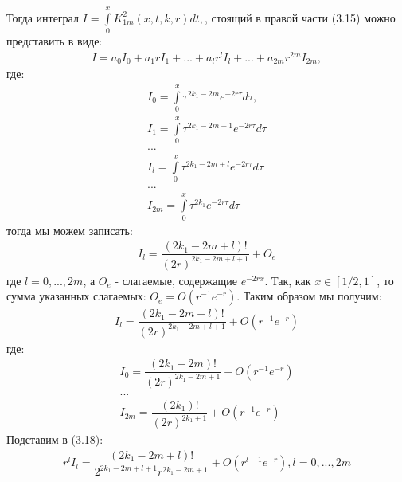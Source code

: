 Тогда интеграл $ I = \int\limits_0^x K_{1m}^2(x,t,k,r)dt, $, стоящий в правой части (3.15) можно представить в виде:
\begin{equation}
\begin{array}{c}

I = a_0I_0 + a_1rI_1 + ... + a_lr^lI_l + ... + a_{2m}r^{2m}I_{2m},

\end{array}
\end{equation}
где:
\begin{equation}
\begin{array}{c}
\nonumber

I_0 = \int\limits_0^x \tau^{2k_1-2m}e^{-2r\tau}d\tau , \\
I_1 = \int\limits_0^x \tau^{2k_1-2m+1}e^{-2r\tau}d\tau \\
... \\
I_l = \int\limits_0^x \tau^{2k_1-2m+l}e^{-2r\tau}d\tau \\
... \\
I_{2m} = \int\limits_0^x \tau^{2k_1}e^{-2r\tau}d\tau

\end{array}
\end{equation}
тогда мы можем записать:
\begin{equation}
\begin{array}{c}
\nonumber

I_l = \dfrac{(2k_1 -2m +l)!}{(2r)^{2k_1-2m+l+1}} + O_e

\end{array}
\end{equation}
где $ l = 0,...,2m $, а $ O_e $ - слагаемые, содержащие $ e^{-2rx} $.
Так, как $ x \in [1/2,1] $, то сумма указанных слагаемых: $ O_e = O(r^{-1}e^{-r}) $. Таким образом мы получим:
\begin{equation}
\begin{array}{c}

I_l = \dfrac{(2k_1 -2m + l)!}{(2r)^{2k_1-2m+l+1}} + O(r^{-1}e^{-r})

\end{array}
\end{equation}
где:
\begin{equation}
\begin{array}{c}
\nonumber

I_0 = \dfrac{(2k_1 -2m)!}{(2r)^{2k_1-2m+1}} + O(r^{-1}e^{-r}) \\
... \\
I_{2m} = \dfrac{(2k_1)!}{(2r)^{2k_1+1}} + O(r^{-1}e^{-r})

\end{array}
\end{equation}
Подставим в (3.18):
\begin{equation}
\begin{array}{c}
\nonumber

r^lI_l = \dfrac{(2k_1 -2m + l)!}{2^{2k_1-2m+l+1}r^{2k_1-2m+1}} + O(r^{l-1}e^{-r}), l = 0,...,2m

\end{array}
\end{equation}

